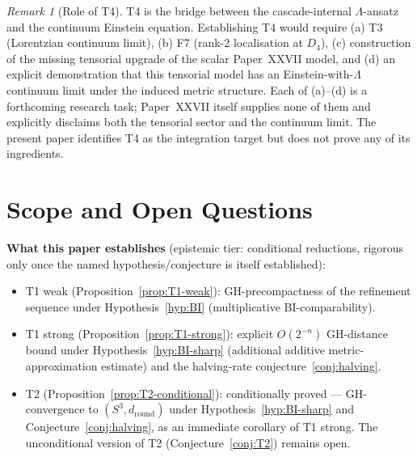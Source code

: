 \documentclass[12pt]{article}
\theoremstyle{definition}
\theoremstyle{remark}
\newtheorem{remark}[theorem]{Remark}
\begin{document}
\begin{remark}[Role of T4]
T4 is the bridge between the cascade-internal $\Lambda$-ansatz and the continuum Einstein equation. Establishing T4 would require (a) T3 (Lorentzian continuum limit), (b) F7 (rank-$2$ localisation at $D_4$), (c) construction of the missing tensorial upgrade of the scalar Paper~XXVII model, and (d) an explicit demonstration that this tensorial model has an Einstein-with-$\Lambda$ continuum limit under the induced metric structure. Each of (a)--(d) is a forthcoming research task; Paper~XXVII itself supplies none of them and explicitly disclaims both the tensorial sector and the continuum limit. The present paper identifies T4 as the integration target but does not prove any of its ingredients.
\end{remark}

\section{Scope and Open Questions}\label{sec:scope}

\textbf{What this paper establishes} (epistemic tier: conditional reductions, rigorous only once the named hypothesis/conjecture is itself established):
\begin{itemize}
\item T1 weak (Proposition~\ref{prop:T1-weak}): GH-precompactness of the refinement sequence under Hypothesis~\ref{hyp:BI} (multiplicative BI-comparability).
\item T1 strong (Proposition~\ref{prop:T1-strong}): explicit $O(2^{-n})$ GH-distance bound under Hypothesis~\ref{hyp:BI-sharp} (additional additive metric-approximation estimate) and the halving-rate conjecture~\ref{conj:halving}.
\item T2 (Proposition~\ref{prop:T2-conditional}): conditionally proved — GH-convergence to $(S^3, d_{\mathrm{round}})$ under Hypothesis~\ref{hyp:BI-sharp} and Conjecture~\ref{conj:halving}, as an immediate corollary of T1 strong. The unconditional version of T2 (Conjecture~\ref{conj:T2}) remains open.
\end{itemize}
\end{document}
